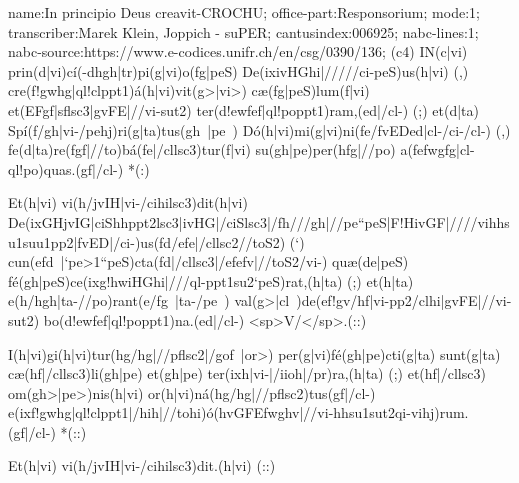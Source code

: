 name:In principio Deus creavit-CROCHU;
office-part:Responsorium;
mode:1;
transcriber:Marek Klein, Joppich - suPER;
cantusindex:006925;
nabc-lines:1;
nabc-source:https://www.e-codices.unifr.ch/en/csg/0390/136;
(c4)
IN(c|vi) prin(d|vi)cí(-dhgh|tr)pi(g|vi)o(fg|peS) De(ixivHGhi|/////ci-peS)us(h|vi) (,)
cre(f!gwhg|ql!clppt1)á(h|vi)vit(g>|vi>) cæ(fg|peS)lum(f|vi)
et(EFgf|sflsc3|gvFE|//vi-sut2) ter(d!ewfef|ql!poppt1)ram,(ed|/cl-) (;)
et(d|ta) Spí(f/gh|vi-/pehj)ri(g|ta)tus(gh~|pe~) Dó(h|vi)mi(g|vi)ni(fe/fvEDed|cl-/ci-/cl-) (,)
fe(d|ta)re(fgf|//to)bá(fe|/cllsc3)tur(f|vi) su(gh|pe)per(hfg|//po) a(fefwgfg|cl-ql!po)quas.(gf|/cl-) *(:)

Et(h|vi) vi(h/jvIH|vi-/cihilsc3)dit(h|vi)
De(ixGHjvIG|ciShhppt2lsc3|ivHG|/ciSlsc3|/fh///gh|//pe``peS|F!HivGF|////vihhsu1suu1pp2|fvED|/ci-)us(fd/efe|/cllsc2//toS2) (`)
cun(efd~|`pe>1``peS)cta(fd|/cllsc3|/efefv|//toS2/vi-)
quæ(de|peS) fé(gh|peS)ce(ixg!hwiHGhi|///ql-ppt1su2`peS)rat,(h|ta) (;)
et(h|ta) e(h/hgh|ta-//po)rant(e/fg~|ta-/pe~)
val(g>|cl~)de(ef!gv/hf|vi-pp2/clhi|gvFE|//vi-sut2) bo(d!ewfef|ql!poppt1)na.(ed|/cl-) <sp>V/</sp>.(::)

I(h|vi)gi(h|vi)tur(hg/hg|//pflsc2|/gof~|or>) per(g|vi)fé(gh|pe)cti(g|ta) sunt(g|ta)
cæ(hf|/cllsc3)li(gh|pe) et(gh|pe) ter(ixh|vi-|/iioh|/pr)ra,(h|ta) (;)
et(hf|/cllsc3) om(gh>|pe>)nis(h|vi) or(h|vi)ná(hg/hg|//pflsc2)tus(gf|/cl-)
e(ixf!gwhg|ql!clppt1|/hih|//tohi)ó(hvGFEfwghv|//vi-hhsu1sut2qi-vihj)rum.(gf|/cl-) *(::)

Et(h|vi) vi(h/jvIH|vi-/cihilsc3)dit.(h|vi) (::)
